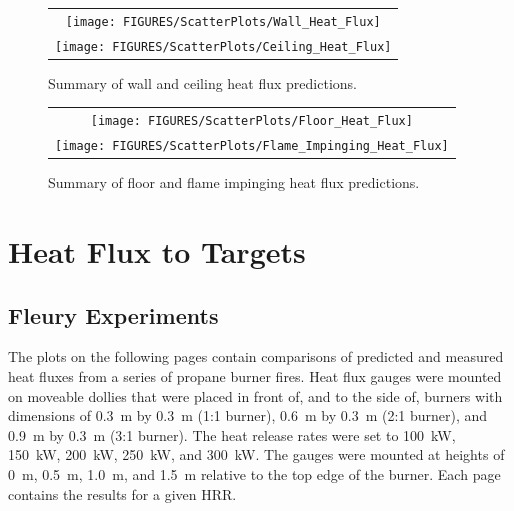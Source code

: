 \begin{figure}[h!]
\begin{center}
\begin{tabular}{c}
\texttt{[image: FIGURES/ScatterPlots/Wall\_Heat\_Flux]} \\
\texttt{[image: FIGURES/ScatterPlots/Ceiling\_Heat\_Flux]}
\end{tabular}
\end{center}
\caption[Summary of wall and ceiling heat flux predictions]
{Summary of wall and ceiling heat flux predictions.}
\end{figure}

\begin{figure}[h!]
\begin{center}
\begin{tabular}{c}
\texttt{[image: FIGURES/ScatterPlots/Floor\_Heat\_Flux]} \\
\texttt{[image: FIGURES/ScatterPlots/Flame\_Impinging\_Heat\_Flux]}
\end{tabular}
\end{center}
\caption[Summary of floor and flame impinging heat flux predictions]
{Summary of floor and flame impinging heat flux predictions.}
\end{figure}



\clearpage

\section{Heat Flux to Targets}

\subsection{Fleury Experiments}

The plots on the following pages contain comparisons of predicted and measured heat fluxes from a series of propane burner fires. Heat flux gauges were mounted on moveable dollies that were placed in front of, and to the side of, burners with dimensions of 0.3~m by 0.3~m (1:1 burner), 0.6~m by 0.3~m (2:1 burner), and 0.9~m by 0.3~m (3:1 burner). The heat release rates were set to 100~kW, 150~kW, 200~kW, 250~kW, and 300~kW. The gauges were mounted at heights of 0~m, 0.5~m, 1.0~m, and 1.5~m relative to the top edge of the burner. Each page contains the results for a given HRR.

